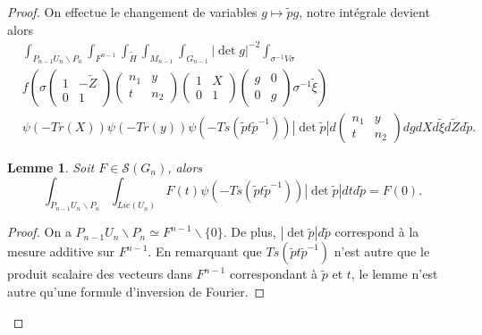 \documentclass{amsart}
\newtheorem{lemme}{Lemme}[section]
\begin{document}
\begin{proof}
On effectue le changement de variables $g \mapsto \tilde{p}g$, notre intégrale devient alors
\begin{equation}
\begin{split}
& \int_{P_{n-1}U_n\backslash{P_n}} \int_{F^{n-1}} \int_{\tilde{H}} \int_{M_{n-1}} \int_{G_{n-1}}  |\det g|^{-2}\int_{\sigma^{-1}V\sigma} \\
& f\left(\sigma \begin{pmatrix}
1 & -\tilde{Z} \\
0 & 1
\end{pmatrix}  \begin{pmatrix}
n_1 & y \\
t & n_2
\end{pmatrix} \begin{pmatrix}
1 & X \\
0 & 1
\end{pmatrix} \begin{pmatrix}
g & 0 \\
0 & g
\end{pmatrix} \sigma^{-1} \tilde{\xi}\right) \\
& \psi(-Tr(X)) \psi(-Tr(y)) \psi(-Ts(\tilde{p}t\tilde{p}^{-1}))  |\det \tilde{p}| d\begin{pmatrix}
n_1 & y \\
t & n_2
\end{pmatrix} dg dX d\tilde{\xi} d\tilde{Z} d\tilde{p}.
\end{split}
\end{equation}

\begin{lemme}
Soit $F \in \mathcal{S}(G_n)$, alors
\begin{equation}
\int_{P_{n-1}U_n\backslash{P_n}} \int_{Lie(U_n)} F(t) \psi(-Ts(\tilde{p}t\tilde{p}^{-1}))|\det \tilde{p}| dt d\tilde{p} = F(0).
\end{equation}
\end{lemme}

\begin{proof}
On a $P_{n-1}U_n\backslash{P_n} \simeq F^{n-1}\backslash{\{0\}}$. De plus, $|\det \tilde{p}| d\tilde{p}$ correspond à la mesure additive sur $F^{n-1}$. En remarquant que $Ts(\tilde{p}t\tilde{p}^{-1})$ n'est autre que le produit scalaire des vecteurs dans $F^{n-1}$ correspondant à $\tilde{p}$ et $t$, le lemme n'est autre qu'une
formule d'inversion de Fourier.
\end{proof}


\end{proof}
\end{document}
